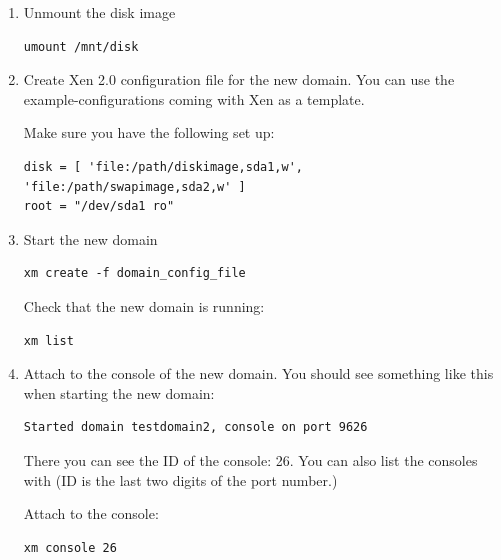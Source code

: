 \documentclass[11pt,twoside,final,openright]{report}
\begin{document}
{\begin{enumerate}
Logout

\item      Unmount the disk image
\begin{small}\begin{verbatim}
umount /mnt/disk
\end{verbatim}\end{small}

\item Create Xen 2.0 configuration file for the new domain. You can
        use the example-configurations coming with Xen as a template.

        Make sure you have the following set up:
\begin{small}\begin{verbatim}
disk = [ 'file:/path/diskimage,sda1,w', 'file:/path/swapimage,sda2,w' ]
root = "/dev/sda1 ro"
\end{verbatim}\end{small}

\item Start the new domain
\begin{small}\begin{verbatim}
xm create -f domain_config_file
\end{verbatim}\end{small}

Check that the new domain is running:
\begin{small}\begin{verbatim}
xm list
\end{verbatim}\end{small}

\item   Attach to the console of the new domain.
        You should see something like this when starting the new domain:

\begin{small}\begin{verbatim}
Started domain testdomain2, console on port 9626
\end{verbatim}\end{small}
        
        There you can see the ID of the console: 26. You can also list
        the consoles with  (ID is the last two
        digits of the port number.)

        Attach to the console:

\begin{small}\begin{verbatim}
xm console 26
\end{verbatim}\end{small}


\end{enumerate}}
\end{document}
